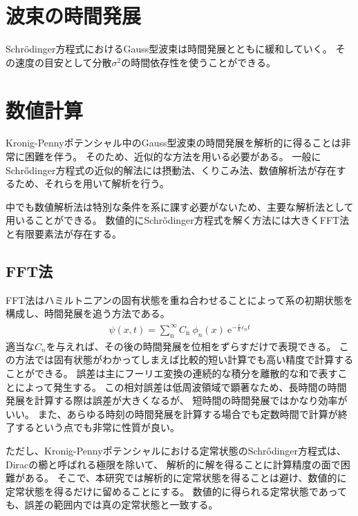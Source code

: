 \documentclass[autodetect-engine,dvipdfmx-if-dvi,ja=standard,a4paper,layout=v2]{bxjsreport}
\begin{document}
    \section{波束の時間発展}
    Schrödinger方程式におけるGauss型波束は時間発展とともに緩和していく。
    その速度の目安として分散$\sigma^2$の時間依存性を使うことができる。
    \section{数値計算}
    Kronig-Pennyポテンシャル中のGauss型波束の時間発展を解析的に得ることは非常に困難を伴う。
    そのため、近似的な方法を用いる必要がある。
    一般にSchrődinger方程式の近似的解法には摂動法、くりこみ法、数値解析法が存在するため、それらを用いて解析を行う。\par
    中でも数値解析法は特別な条件を系に課す必要がないため、主要な解析法として用いることができる。
    数値的にSchrődinger方程式を解く方法には大きくFFT法と有限要素法が存在する。
    \subsection{FFT法}
    FFT法はハミルトニアンの固有状態を重ね合わせることによって系の初期状態を構成し、時間発展を追う方法である。
    \begin{align}
        \psi(x,t)=\sum_{\mathrm{n}}^{\infty}C_{\mathrm{n}}\ \phi_{n}(x)\ \mathrm{e}^{-\frac{i}{\hbar}\varepsilon_n t}
    \end{align}
    適当な$C_{n}$を与えれば、その後の時間発展を位相をずらすだけで表現できる。
    この方法では固有状態がわかってしまえば比較的短い計算でも高い精度で計算することができる。
    誤差は主にフーリエ変換の連続的な積分を離散的な和で表すことによって発生する。
    この相対誤差は低周波領域で顕著なため、長時間の時間発展を計算する際は誤差が大きくなるが、
    短時間の時間発展ではかなり効率がいい。
    また、あらゆる時刻の時間発展を計算する場合でも定数時間で計算が終了するという点でも非常に性質が良い。\par
    ただし、Kronig-Pennyポテンシャルにおける定常状態のSchrődinger方程式は、Diracの櫛と呼ばれる極限を除いて、
    解析的に解を得ることに計算精度の面で困難がある。
    そこで、本研究では解析的に定常状態を得ることは避け、数値的に定常状態を得るだけに留めることにする。
    数値的に得られる定常状態であっても、誤差の範囲内では真の定常状態と一致する。
\end{document}
